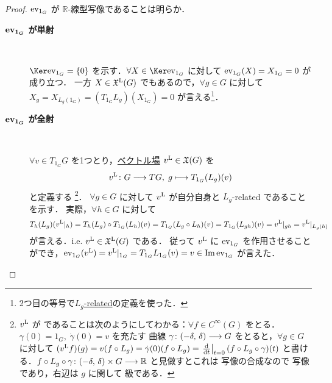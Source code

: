 \documentclass[geometry_main]{subfiles}
\begin{document}
\begin{proof}
    $\mathrm{ev}_{1_G}$ が $\mathbb{R}$-線型写像であることは明らか．
    \begin{description}
        \item[\textbf{$\bm{\mathrm{ev}_{1_G}}$ が単射}]　
        
        $\Ker \evalunit = \{ 0 \}$ を示す．$\forall X \in \Ker \evalunit$ に対して $\mathrm{ev}_{1_G} (X) = X_{1_G} = 0$ が成り立つ．
        一方 $X \in \mathfrak{X}^{\mathrm{L}}(G)$ でもあるので，$\forall g \in G$ に対して $X_g = X_{L_g(1_G)} = (T_{1_G} L_g)(X_{1_G}) = 0$ が言える\footnote{2つ目の等号で\hyperref[def:F-related]{$L_g$-related}の定義を使った．}．
        \item[\textbf{$\bm{\mathrm{ev}_{1_G}}$ が全射}]　
        
        $\forall v \in T_{1_G} G$ を1つとり，\hyperref[def:vecf]{\cinfty ベクトル場} $v^{\mathrm{L}} \in \mathfrak{X}(G)$ を
        \begin{align}
            \label{eq:vL}
            v^{\mathrm{L}} \colon G \longrightarrow TG,\; g \longmapsto T_{1_G} (L_g) (v)
        \end{align}
        と定義する
        \footnote{
            $v^{\mathrm{L}}$ が \cinfty であることは次のようにしてわかる：$\forall f \in C^\infty (G)$ をとる．$\gamma(0) = 1_G,\; \dot{\gamma}(0) = v$ を充たす \cinfty 曲線 $\gamma \colon (-\delta,\, \delta) \longrightarrow G$ をとると，$\forall g \in G$ に対して $(\Lie{v} f)(g) = v (f \circ L_g) = \dot{\gamma}(0) (f \circ L_g) = \eval{\dv{}{t}}_{t=0} (f \circ L_g \circ \gamma)(t)$ と書ける．$f \circ L_g \circ \gamma \colon (-\delta,\, \delta) \times G \longrightarrow \mathbb{R}$ と見做すとこれは \cinfty 写像の合成なので \cinfty 写像であり，右辺は $g$ に関して \cinfty 級である．
        }．
        $\forall g \in G$ に対して $v^{\mathrm{L}}$ が自分自身と $L_g$-related であることを示す．
        実際，$\forall h \in G$ に対して
        \begin{align}
            T_h(L_g) (v^{\mathrm{L}}|_h) &= T_h(L_g) \circ T_{1_G}(L_h)(v) = T_{1_G}(L_g \circ L_h)(v) = T_{1_G}(L_{gh})(v) = v^{\mathrm{L}}|_{gh} = v^{\mathrm{L}}|_{L_g(h)}
        \end{align}
        が言える．i.e. $v^{\mathrm{L}} \in \mathfrak{X}^{\mathrm{L}}(G)$ である．
        従って $v^{\mathrm{L}}$ に $\mathrm{ev}_{1_G}$ を作用させることができ，$\mathrm{ev}_{1_G} (v^{\mathrm{L}}) = v^{\mathrm{L}}|_{1_G} = T_{1_G} L_{1_G} (v) = v \in \Im \mathrm{ev}_{1_G}$ が言えた．
    \end{description}
\end{proof}



\end{document}

